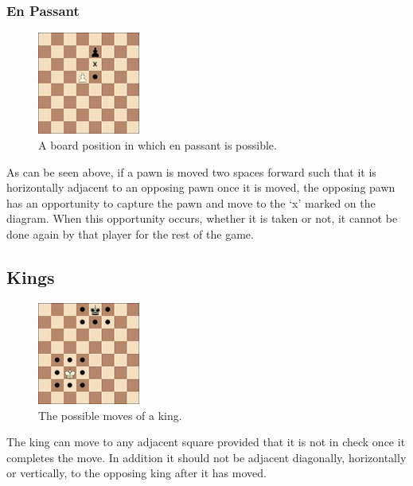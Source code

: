 \documentclass[twoside, 12pt]{report}
\begin{document}
\subsubsection{En Passant}
\begin{figure}[H]
\centering
	\includegraphics[width=0.3\textwidth]{images/boards/en_passant}
	\caption{A board position in which en passant is possible.}
\end{figure}
As can be seen above, if a pawn is moved two spaces forward such that it is horizontally adjacent to an opposing pawn once it is moved, the opposing pawn has an opportunity to capture the pawn and move to the ‘x' marked on the diagram. When this opportunity occurs, whether it is taken or not, it cannot be done again by that player for the rest of the game.
\subsection{Kings}
\begin{figure}[H]
\centering
	\includegraphics[width=0.3\textwidth]{images/boards/king_movement}
	\caption{The possible moves of a king.}
\end{figure}
The king can move to any adjacent square provided that it is not in check once it completes the move. In addition it should not be adjacent diagonally, horizontally or vertically, to the opposing king after it has moved. 
\end{document}
